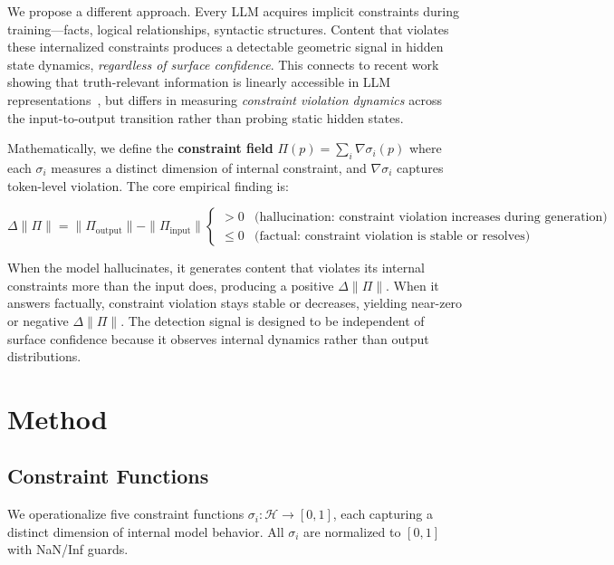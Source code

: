 \documentclass[11pt]{article}
\begin{document}
We propose a different approach. Every LLM acquires implicit constraints during training---facts, logical relationships, syntactic structures. Content that violates these internalized constraints produces a detectable geometric signal in hidden state dynamics, \textit{regardless of surface confidence}. This connects to recent work showing that truth-relevant information is linearly accessible in LLM representations~\cite{burns2022discovering,azaria2023internal}, but differs in measuring \textit{constraint violation dynamics} across the input-to-output transition rather than probing static hidden states.

Mathematically, we define the \textbf{constraint field} $\Pi(p) = \sum_i \nabla\sigma_i(p)$ where each $\sigma_i$ measures a distinct dimension of internal constraint, and $\nabla\sigma_i$ captures token-level violation. The core empirical finding is:

\begin{equation}
\Delta\|\Pi\| = \|\Pi_{\text{output}}\| - \|\Pi_{\text{input}}\| \begin{cases}
> 0 & \text{(hallucination: constraint violation increases during generation)} \\
\leq 0 & \text{(factual: constraint violation is stable or resolves)}
\end{cases}
\label{eq:hypothesis}
\end{equation}

When the model hallucinates, it generates content that violates its internal constraints more than the input does, producing a positive $\Delta\|\Pi\|$. When it answers factually, constraint violation stays stable or decreases, yielding near-zero or negative $\Delta\|\Pi\|$. The detection signal is designed to be independent of surface confidence because it observes internal dynamics rather than output distributions.

\section{Method}

\subsection{Constraint Functions}

We operationalize five constraint functions $\sigma_i: \mathcal{H} \rightarrow [0,1]$, each capturing a distinct dimension of internal model behavior. All $\sigma_i$ are normalized to $[0,1]$ with NaN/Inf guards.
\end{document}
